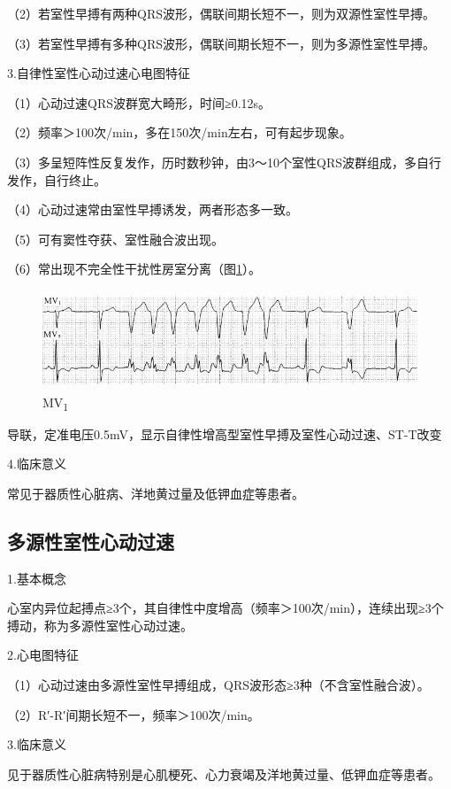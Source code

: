（2）若室性早搏有两种QRS波形，偶联间期长短不一，则为双源性室性早搏。

（3）若室性早搏有多种QRS波形，偶联间期长短不一，则为多源性室性早搏。

3.自律性室性心动过速心电图特征

（1）心动过速QRS波群宽大畸形，时间≥0.12s。

（2）频率＞100次/min，多在150次/min左右，可有起步现象。

（3）多呈短阵性反复发作，历时数秒钟，由3～10个室性QRS波群组成，多自行发作，自行终止。

（4）心动过速常由室性早搏诱发，两者形态多一致。

（5）可有窦性夺获、室性融合波出现。

（6）常出现不完全性干扰性房室分离（图\ref{fig15-10}）。

\begin{figure}[!htbp]
 \centering
 \includegraphics[width=4.97917in,height=1.16667in]{./images/Image00276.jpg}
 \captionsetup{justification=centering}
 \caption{MV\textsubscript{1}}
 \label{fig15-10}
  \end{figure} 
导联，定准电压0.5mV，显示自律性增高型室性早搏及室性心动过速、ST-T改变

4.临床意义

常见于器质性心脏病、洋地黄过量及低钾血症等患者。

\protect\hypertarget{text00022.htmlux5cux23subid273}{}{}

\subsection{多源性室性心动过速}

1.基本概念

心室内异位起搏点≥3个，其自律性中度增高（频率＞100次/min），连续出现≥3个搏动，称为多源性室性心动过速。

2.心电图特征

（1）心动过速由多源性室性早搏组成，QRS波形态≥3种（不含室性融合波）。

（2）R′-R′间期长短不一，频率＞100次/min。

3.临床意义

见于器质性心脏病特别是心肌梗死、心力衰竭及洋地黄过量、低钾血症等患者。

